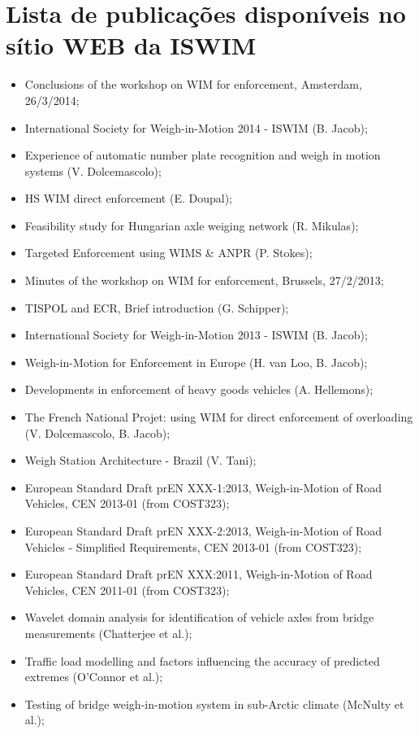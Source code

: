 \documentclass{ufscThesis}
\begin{document}
\chapter{Lista de publicações disponíveis no sítio WEB da ISWIM}\label{anexo:index-iswim}

\begin{itemize}
\item Conclusions of the workshop on WIM for enforcement, Amsterdam, 26/3/2014;
\item International Society for Weigh-in-Motion 2014 - ISWIM (B. Jacob);
\item Experience of automatic number plate recognition and weigh in motion systems (V. Dolcemascolo);
\item HS WIM direct enforcement (E. Doupal);
\item Feasibility study for Hungarian axle weiging network (R. Mikulas);
\item Targeted Enforcement using WIMS \& ANPR (P. Stokes);
\item Minutes of the workshop on WIM for enforcement, Brussels, 27/2/2013;
\item TISPOL and ECR, Brief introduction (G. Schipper);
\item International Society for Weigh-in-Motion 2013 - ISWIM (B. Jacob);
\item Weigh-in-Motion for Enforcement in Europe (H. van Loo, B. Jacob);
\item Developments in enforcement of heavy goods vehicles (A. Hellemons);
\item The French National Projet: using WIM for direct enforcement of overloading (V. Dolcemascolo, B. Jacob);
\item Weigh Station Architecture - Brazil (V. Tani);
\item European Standard Draft prEN XXX-1:2013, Weigh-in-Motion of Road Vehicles, CEN 2013-01 (from COST323);
\item European Standard Draft prEN XXX-2:2013, Weigh-in-Motion of Road Vehicles - Simplified Requirements, CEN 2013-01 (from COST323);
\item European Standard Draft prEN XXX:2011, Weigh-in-Motion of Road Vehicles, CEN 2011-01 (from COST323);
\item Wavelet domain analysis for identification of vehicle axles from bridge measurements (Chatterjee et al.);
\item Traffic load modelling and factors influencing the accuracy of predicted extremes (O'Connor et al.);
\item Testing of bridge weigh-in-motion system in sub-Arctic climate (McNulty et al.);

\end{itemize}
\end{document}
